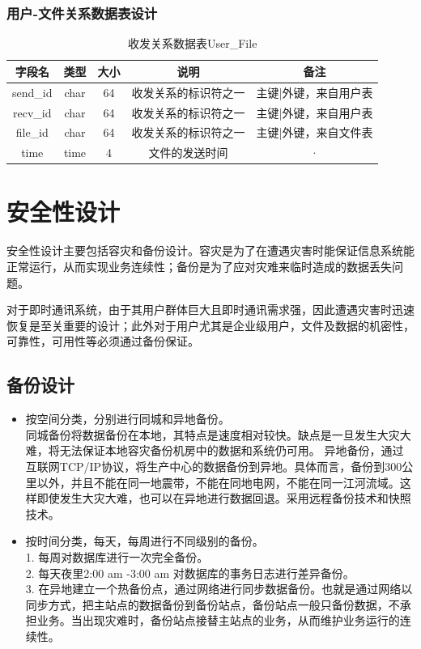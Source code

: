 \subsubsection{用户-文件关系数据表设计}
\begin{table}[htbp]
\centering
\caption{收发关系数据表User\_File} \label{tab:order-database}
\begin{tabular}{|c|c|c|c|c|}
    \hline
    字段名 & 类型 & 大小 & 说明 & 备注 \\
    \hline
    send\_id & char & 64 & 收发关系的标识符之一 & 主键|外键，来自用户表 \\
    \hline
    recv\_id & char & 64 & 收发关系的标识符之一 & 主键|外键，来自用户表 \\
    \hline
    file\_id & char & 64 & 收发关系的标识符之一 & 主键|外键，来自文件表 \\
    \hline
    time & time & 4 & 文件的发送时间 & · \\ 
    \hline
\end{tabular}
\end{table}



\newpage

\section{安全性设计}
安全性设计主要包括容灾和备份设计。容灾是为了在遭遇灾害时能保证信息系统能正常运行，从而实现业务连续性；备份是为了应对灾难来临时造成的数据丢失问题。

对于即时通讯系统，由于其用户群体巨大且即时通讯需求强，因此遭遇灾害时迅速恢复是至关重要的设计；此外对于用户尤其是企业级用户，文件及数据的机密性，可靠性，可用性等必须通过备份保证。

\subsection{备份设计}
\begin{itemize}
\item 按空间分类，分别进行同城和异地备份。\\
同城备份将数据备份在本地，其特点是速度相对较快。缺点是一旦发生大灾大难，将无法保证本地容灾备份机房中的数据和系统仍可用。
异地备份，通过互联网TCP/IP协议，将生产中心的数据备份到异地。具体而言，备份到300公里以外，并且不能在同一地震带，不能在同地电网，不能在同一江河流域。这样即使发生大灾大难，也可以在异地进行数据回退。采用远程备份技术和快照技术。

\item 按时间分类，每天，每周进行不同级别的备份。\\
1. 每周对数据库进行一次完全备份。\\
2. 每天夜里2:00 am -3:00 am 对数据库的事务日志进行差异备份。\\
3. 在异地建立一个热备份点，通过网络进行同步数据备份。也就是通过网络以同步方式，把主站点的数据备份到备份站点，备份站点一般只备份数据，不承担业务。当出现灾难时，备份站点接替主站点的业务，从而维护业务运行的连续性。\\
\end{itemize}

